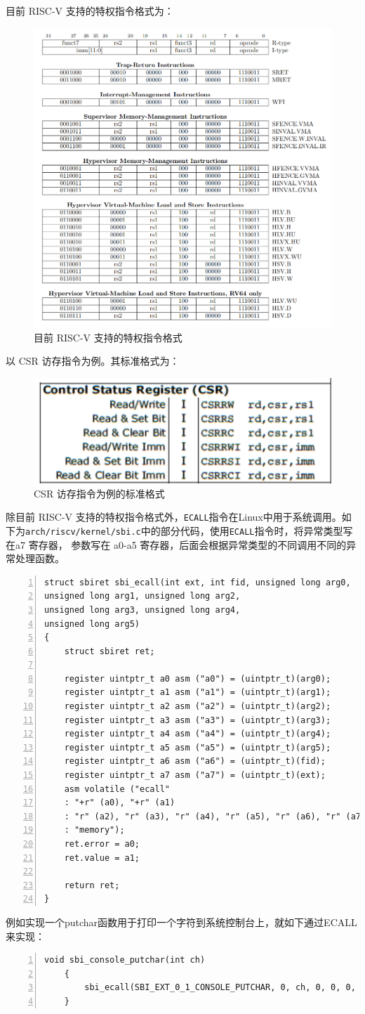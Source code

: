 \documentclass[UTF8,fontset=none,linespread=1.15]{ctexart}
\begin{document}
目前 RISC-V 支持的特权指令格式为：
\begin{figure}[!hbt]
	\centering
	\includegraphics[width=0.7\linewidth]{assets/W2}
	\caption{目前 RISC-V 支持的特权指令格式}
	\label{fig:w2}
\end{figure}
以 CSR 访存指令为例。其标准格式为：
\begin{figure}[!hbt]
	\centering
	\includegraphics[width=0.7\linewidth]{assets/W3}
	\caption{ CSR 访存指令为例的标准格式}
	\label{fig:w3}
\end{figure}
除目前 RISC-V 支持的特权指令格式外，\texttt{ECALL}指令在Linux中用于系统调用。如下为\texttt{arch/riscv/kernel/sbi.c}中的部分代码，使用\texttt{ECALL}指令时，将异常类型写在a7 寄存器， 参数写在 a0-a5 寄存器，后面会根据异常类型的不同调用不同的异常处理函数。
\begin{lstlisting}[numbers=left]
struct sbiret sbi_ecall(int ext, int fid, unsigned long arg0,
unsigned long arg1, unsigned long arg2,
unsigned long arg3, unsigned long arg4,
unsigned long arg5)
{
	struct sbiret ret;
	
	register uintptr_t a0 asm ("a0") = (uintptr_t)(arg0);
	register uintptr_t a1 asm ("a1") = (uintptr_t)(arg1);
	register uintptr_t a2 asm ("a2") = (uintptr_t)(arg2);
	register uintptr_t a3 asm ("a3") = (uintptr_t)(arg3);
	register uintptr_t a4 asm ("a4") = (uintptr_t)(arg4);
	register uintptr_t a5 asm ("a5") = (uintptr_t)(arg5);
	register uintptr_t a6 asm ("a6") = (uintptr_t)(fid);
	register uintptr_t a7 asm ("a7") = (uintptr_t)(ext);
	asm volatile ("ecall"
	: "+r" (a0), "+r" (a1)
	: "r" (a2), "r" (a3), "r" (a4), "r" (a5), "r" (a6), "r" (a7)
	: "memory");
	ret.error = a0;
	ret.value = a1;
	
	return ret;
}
\end{lstlisting}​		
例如实现一个putchar函数用于打印一个字符到系统控制台上，就如下通过ECALL来实现：
\begin{lstlisting}[numbers=left]
	void sbi_console_putchar(int ch)
	{
		sbi_ecall(SBI_EXT_0_1_CONSOLE_PUTCHAR, 0, ch, 0, 0, 0, 0, 0);
	}
\end{lstlisting}
\end{document}
